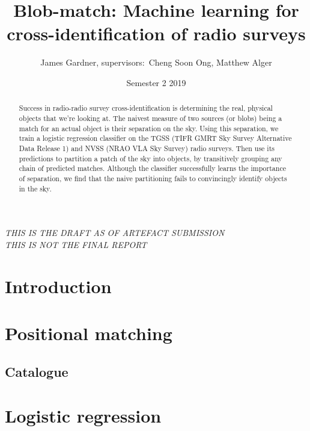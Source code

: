 \documentclass[12pt,a4paper]{article}
\title{Blob-match: Machine learning for cross-identification of radio surveys}
\author{James Gardner, supervisors:\ Cheng Soon Ong, Matthew Alger}
\date{Semester 2 2019}
\begin{document}
\begin{center}
\emph{THIS IS THE DRAFT AS OF ARTEFACT SUBMISSION\\
THIS IS NOT THE FINAL REPORT}    
\end{center}

\maketitle

\begin{abstract}
Success in radio-radio survey cross-identification is determining the real, physical objects that we're looking at. The naivest measure of two sources (or blobs) being a match for an actual object is their separation on the sky. Using this separation, we train a logistic regression classifier on the TGSS (TIFR GMRT Sky Survey Alternative Data Release 1) and NVSS (NRAO VLA Sky Survey) radio surveys. Then use its predictions to partition a patch of the sky into objects, by transitively grouping any chain of predicted matches. Although the classifier successfully learns the importance of separation, we find that the naive partitioning fails to convincingly identify objects in the sky.
\end{abstract}

\section{Introduction}


\section{Positional matching}

\subsection{}
\subsection{}
\subsection{Catalogue}


\section{Logistic regression}
\end{document}
